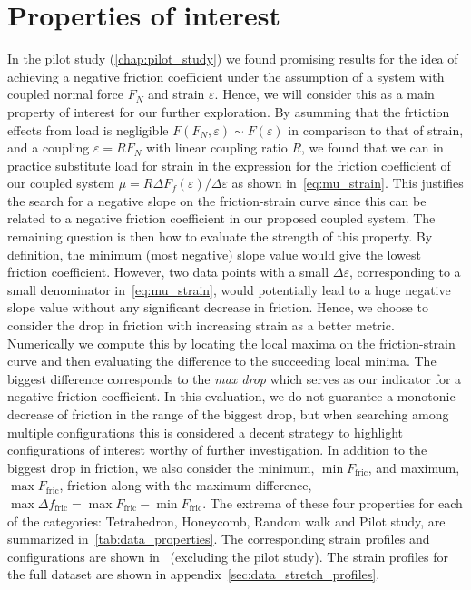 \section{Properties of interest} 
In the pilot study (\cref{chap:pilot_study}) we found promising results for the idea of achieving a negative friction coefficient under the assumption of a system with coupled normal force $F_N$ and strain $\varepsilon$. Hence, we will consider this as a main property of interest for our further exploration. By asumming that the frtiction effects from load is negligible $F(F_N, \varepsilon) \sim F(\varepsilon)$ in comparison to that of strain, and a coupling $\varepsilon = R F_N$ with linear coupling ratio $R$, we found that we can in practice substitute load for strain in the expression for the friction coefficient of our coupled system $\mu = R\Delta F_f(\varepsilon) / \Delta \varepsilon$ as shown in~\cref{eq:mu_strain}. This justifies the search for a negative slope on the friction-strain curve since this can be related to a negative friction coefficient in our proposed coupled system. The remaining question is then how to evaluate the
strength of this property. By definition, the minimum (most negative) slope
value would give the lowest friction coefficient. However, two data points with
a small $\Delta \varepsilon$, corresponding to a small denominator
in~\cref{eq:mu_strain}, would potentially lead to a huge negative slope value
without any significant decrease in friction. Hence, we choose to consider the
drop in friction with increasing strain as a better metric. Numerically we
compute this by locating the local maxima on the friction-strain curve and then
evaluating the difference to the succeeding local minima. The biggest difference
corresponds to the \textit{max drop} which serves as our indicator for a
negative friction coefficient. In this evaluation, we do not guarantee a
monotonic decrease of friction in the range of the biggest drop, but when
searching among multiple configurations this is considered a decent strategy to
highlight configurations of interest worthy of further investigation. In
addition to the biggest drop in friction, we also consider the minimum, $\min
F_{\text{fric}}$, and maximum, $\max F_{\text{fric}}$, friction along with the
maximum difference, $\max \Delta f_{\text{fric}} = \max F_{\text{fric}} - \min
F_{\text{fric}}$. The extrema of these four properties for each of the
categories: Tetrahedron, Honeycomb, Random walk and Pilot study, are summarized
in~\cref{tab:data_properties}. The corresponding strain profiles and
configurations are shown in~ (excluding
the pilot study). The strain profiles for the full dataset are shown in
appendix~\ref {sec:data_stretch_profiles}. 

